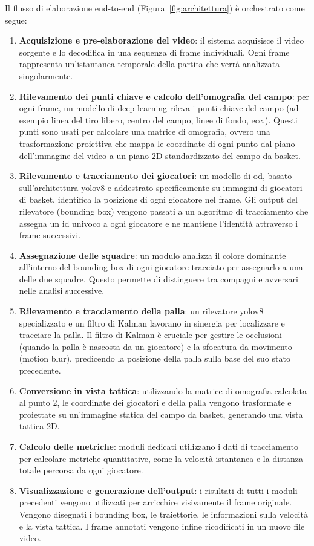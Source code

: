 \documentclass[12pt,a4paper,openright,twoside]{book}
\begin{document}
Il flusso di elaborazione end-to-end (Figura~\ref{fig:architettura}) è orchestrato come segue:
\begin{enumerate}
  \item \textbf{Acquisizione e pre-elaborazione del video}: il sistema acquisisce il video sorgente e lo decodifica in 
  una sequenza di frame individuali. Ogni frame rappresenta un'istantanea temporale della partita che verrà analizzata 
  singolarmente.
  \item \textbf{Rilevamento dei punti chiave e calcolo dell'omografia del campo}: per ogni frame, un modello di deep 
  learning rileva i punti chiave del campo (ad esempio linea del tiro libero, centro del campo, linee di fondo, ecc.).
  Questi punti sono usati per calcolare una matrice di omografia, ovvero una trasformazione proiettiva che mappa le 
  coordinate di ogni punto dal piano dell'immagine del video a un piano 2D standardizzato del campo da basket.
  \item \textbf{Rilevamento e tracciamento dei giocatori}: un modello di \ac{od}, basato sull'architettura 
  \ac{yolo}v8 e addestrato specificamente su immagini di giocatori di basket, identifica la posizione di ogni giocatore 
  nel frame. Gli output del rilevatore (bounding box) vengono passati a un algoritmo di tracciamento che assegna un \ac{id} 
  univoco a ogni giocatore e ne mantiene l'identità attraverso i frame successivi.
  \item \textbf{Assegnazione delle squadre}: un modulo analizza il colore dominante all'interno del bounding box di 
  ogni giocatore tracciato per assegnarlo a una delle due squadre. Questo permette di distinguere tra compagni e 
  avversari nelle analisi successive.
  \item \textbf{Rilevamento e tracciamento della palla}: un rilevatore \ac{yolo}v8 specializzato e un filtro di Kalman 
  lavorano in sinergia per localizzare e tracciare la palla. Il filtro di Kalman è cruciale per gestire le occlusioni 
  (quando la palla è nascosta da un giocatore) e la sfocatura da movimento (motion blur), predicendo la posizione della palla sulla base del suo 
  stato precedente.
  \item \textbf{Conversione in vista tattica}: utilizzando la matrice di omografia calcolata al punto 2, le coordinate 
  dei giocatori e della palla vengono trasformate e proiettate su un'immagine statica del campo da basket, generando 
  una vista tattica 2D.
  \item \textbf{Calcolo delle metriche}: moduli dedicati utilizzano i dati di tracciamento per calcolare metriche 
  quantitative, come la velocità istantanea e la distanza totale percorsa da ogni giocatore.
  \item \textbf{Visualizzazione e generazione dell'output}: i risultati di tutti i moduli precedenti vengono utilizzati 
  per arricchire visivamente il frame originale. Vengono disegnati i bounding box, le traiettorie, le informazioni sulla 
  velocità e la vista tattica. I frame annotati vengono infine ricodificati in un nuovo file video.
\end{enumerate}
\end{document}
